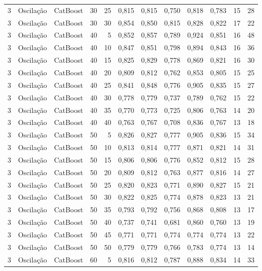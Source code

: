 \begin{longtable}{ccclrrrrrrrr}
3 & Oscilação & CatBoost & 30 & 25 & 0,815 & 0,815 & 0,750 & 0,818 & 0,783 & 15 & 28 \\
3 & Oscilação & CatBoost & 30 & 30 & 0,854 & 0,850 & 0,815 & 0,828 & 0,822 & 17 & 22 \\
3 & Oscilação & CatBoost & 40 & 5 & 0,852 & 0,857 & 0,789 & 0,924 & 0,851 & 16 & 48 \\
3 & Oscilação & CatBoost & 40 & 10 & 0,847 & 0,851 & 0,798 & 0,894 & 0,843 & 16 & 36 \\
3 & Oscilação & CatBoost & 40 & 15 & 0,825 & 0,829 & 0,778 & 0,869 & 0,821 & 16 & 30 \\
3 & Oscilação & CatBoost & 40 & 20 & 0,809 & 0,812 & 0,762 & 0,853 & 0,805 & 15 & 25 \\
3 & Oscilação & CatBoost & 40 & 25 & 0,841 & 0,848 & 0,776 & 0,905 & 0,835 & 15 & 27 \\
3 & Oscilação & CatBoost & 40 & 30 & 0,778 & 0,779 & 0,737 & 0,789 & 0,762 & 15 & 22 \\
3 & Oscilação & CatBoost & 40 & 35 & 0,770 & 0,773 & 0,725 & 0,806 & 0,763 & 14 & 20 \\
3 & Oscilação & CatBoost & 40 & 40 & 0,763 & 0,767 & 0,708 & 0,836 & 0,767 & 13 & 18 \\
3 & Oscilação & CatBoost & 50 & 5 & 0,826 & 0,827 & 0,777 & 0,905 & 0,836 & 15 & 34 \\
3 & Oscilação & CatBoost & 50 & 10 & 0,813 & 0,814 & 0,777 & 0,871 & 0,821 & 14 & 31 \\
3 & Oscilação & CatBoost & 50 & 15 & 0,806 & 0,806 & 0,776 & 0,852 & 0,812 & 15 & 28 \\
3 & Oscilação & CatBoost & 50 & 20 & 0,809 & 0,812 & 0,763 & 0,877 & 0,816 & 14 & 27 \\
3 & Oscilação & CatBoost & 50 & 25 & 0,820 & 0,823 & 0,771 & 0,890 & 0,827 & 15 & 21 \\
3 & Oscilação & CatBoost & 50 & 30 & 0,822 & 0,825 & 0,774 & 0,878 & 0,823 & 13 & 21 \\
3 & Oscilação & CatBoost & 50 & 35 & 0,793 & 0,792 & 0,756 & 0,868 & 0,808 & 13 & 17 \\
3 & Oscilação & CatBoost & 50 & 40 & 0,737 & 0,741 & 0,681 & 0,860 & 0,760 & 13 & 19 \\
3 & Oscilação & CatBoost & 50 & 45 & 0,771 & 0,771 & 0,774 & 0,774 & 0,774 & 13 & 22 \\
3 & Oscilação & CatBoost & 50 & 50 & 0,779 & 0,779 & 0,766 & 0,783 & 0,774 & 13 & 14 \\
3 & Oscilação & CatBoost & 60 & 5 & 0,816 & 0,812 & 0,787 & 0,888 & 0,834 & 14 & 33 \\

\end{longtable}
